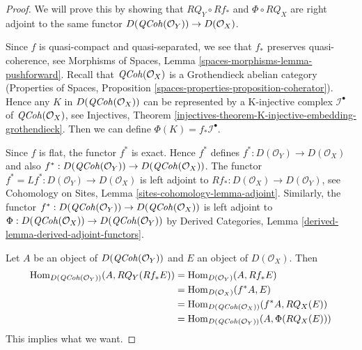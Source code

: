 \begin{proof}
We will prove this by showing that $RQ_Y \circ Rf_*$ and $\Phi \circ RQ_X$
are right adjoint to the same functor
$D(\mathit{QCoh}(\mathcal{O}_Y)) \to D(\mathcal{O}_X)$.

\medskip\noindent
Since $f$ is quasi-compact and quasi-separated, we see that
$f_*$ preserves quasi-coherence, see
Morphisms of Spaces, Lemma \ref{spaces-morphisms-lemma-pushforward}.
Recall that $\mathit{QCoh}(\mathcal{O}_X)$ is a Grothendieck abelian category
(Properties of Spaces, Proposition
\ref{spaces-properties-proposition-coherator}).
Hence any $K$ in $D(\mathit{QCoh}(\mathcal{O}_X))$
can be represented by a K-injective complex $\mathcal{I}^\bullet$
of $\mathit{QCoh}(\mathcal{O}_X)$, see
Injectives, Theorem
\ref{injectives-theorem-K-injective-embedding-grothendieck}.
Then we can define $\Phi(K) = f_*\mathcal{I}^\bullet$.

\medskip\noindent
Since $f$ is flat, the functor $f^*$ is exact. Hence $f^*$ defines
$f^* : D(\mathcal{O}_Y) \to D(\mathcal{O}_X)$ and also
$f^* : D(\mathit{QCoh}(\mathcal{O}_Y)) \to D(\mathit{QCoh}(\mathcal{O}_X))$.
The functor $f^* = Lf^* : D(\mathcal{O}_Y) \to D(\mathcal{O}_X)$
is left adjoint to
$Rf_* : D(\mathcal{O}_X) \to D(\mathcal{O}_Y)$,
see Cohomology on Sites, Lemma \ref{sites-cohomology-lemma-adjoint}.
Similarly, the functor
$f^* : D(\mathit{QCoh}(\mathcal{O}_Y)) \to D(\mathit{QCoh}(\mathcal{O}_X))$
is left adjoint to
$\Phi : D(\mathit{QCoh}(\mathcal{O}_X)) \to D(\mathit{QCoh}(\mathcal{O}_Y))$
by Derived Categories, Lemma \ref{derived-lemma-derived-adjoint-functors}.

\medskip\noindent
Let $A$ be an object of $D(\mathit{QCoh}(\mathcal{O}_Y))$ and
$E$ an object of $D(\mathcal{O}_X)$. Then
\begin{align*}
\operatorname{Hom}_{D(\mathit{QCoh}(\mathcal{O}_Y))}(A, RQ_Y(Rf_*E))
& =
\operatorname{Hom}_{D(\mathcal{O}_Y)}(A, Rf_*E) \\
& =
\operatorname{Hom}_{D(\mathcal{O}_X)}(f^*A, E) \\
& =
\operatorname{Hom}_{D(\mathit{QCoh}(\mathcal{O}_X))}(f^*A, RQ_X(E)) \\
& =
\operatorname{Hom}_{D(\mathit{QCoh}(\mathcal{O}_Y))}(A, \Phi(RQ_X(E)))
\end{align*}
This implies what we want.
\end{proof}

